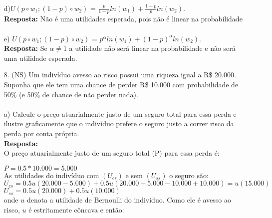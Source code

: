 \begin{enumerate}
\paragraph{} d){$U( p \circ w_1; (1 - p) \circ w_2)$} = {$ \frac{p}{1 - p} ln(w_1) + \frac{1 - p}{p} ln(w_2).$}\\

\textbf{Resposta:} Não é uma utilidades esperada, pois não é linear na probabilidade

\paragraph{} e) {$U( p \circ w_1; (1 - p) \circ w_2)$} = {$ p^ \alpha ln(w_1) + (1 - p)^\alpha ln(w_2).$}\\

\textbf{Resposta:} Se {$\alpha \neq 1$} a utilidade não será linear na probabilidade e não será uma utilidade esperada.


\item[8.] (NS) Um indivíduo avesso ao risco possui uma riqueza igual a R\$ 20.000. Suponha que ele tem uma chance de perder R\$ 10.000 com probabilidade de 50\% (e 50\% de chance de não perder nada).\\

\paragraph{} a) Calcule o preço atuarialmente justo de um seguro total para essa perda e ilustre graficamente que o indivíduo prefere o seguro justo a correr risco da perda por conta própria.\\

\textbf{Resposta:}\\

O preço atuarialmente justo de um seguro total (P) para essa perda é:


{$P = 0.5 * 10.000 = 5.000$}\\


As utilidades do indivíduo com {$(U_{cs})$} e sem {$(U_{ss})$} o seguro são:\\


{$U_{cs} = 0.5u(20.000 - 5.000) + 0.5u(20.000 - 5.000 - 10.000 + 10.000) = u(15.000)$}
{$U_{ss} = 0.5u(20.000) + 0.5u(10.000)$}\\


onde {$u$} denota a utilidade de Bernoulli do indivíduo. Como ele é avesso ao risco, {$u$} é
estritamente côncava e então:\\



\end{enumerate}
